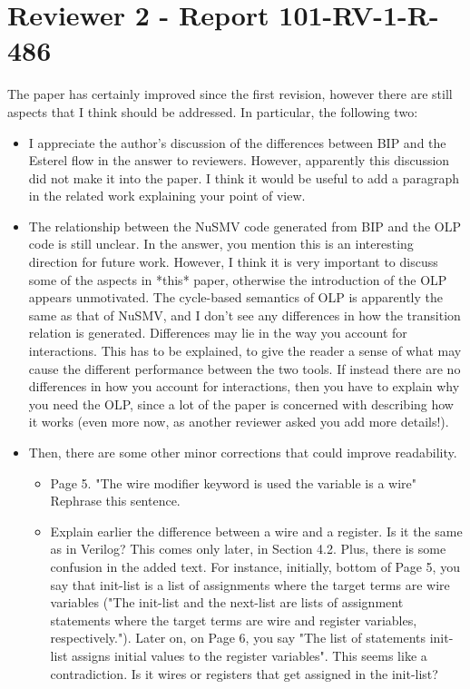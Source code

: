 \section{Reviewer 2 - Report 101-RV-1-R-486}
%
%
The paper has certainly improved since the first revision, however there are
still aspects that I think should be addressed. In particular, the following
two:

\begin{itemize}
\item I appreciate the author's discussion of the differences between BIP and the
Esterel flow in the answer to reviewers. However, apparently this discussion
did not make it into the paper. I think it would be useful to add a paragraph
in the related work explaining your point of view.

\item The relationship between the NuSMV code generated from BIP and the OLP code
is still unclear. In the answer, you mention this is an interesting direction
for future work. However, I think it is very important to discuss some of the
aspects in *this* paper, otherwise the introduction of the OLP appears
unmotivated. The cycle-based semantics of OLP is apparently the same as that
of NuSMV, and I don't see any differences in how the transition relation is
generated. Differences may lie in the way you account for interactions. This
has to be explained, to give the reader a sense of what may cause the
different performance between the two tools. If instead there are no
differences in how you account for interactions, then you have to explain why
you need the OLP, since a lot of the paper is concerned with describing how it
works (even more now, as another reviewer asked you add more details!).


\item Then, there are some other minor corrections that could improve readability.
\begin{itemize}
\item  Page 5. "The wire modifier keyword is used the variable is a wire"
Rephrase this sentence.
\item  Explain earlier the difference between a wire and a register. Is it the same
as in Verilog? This comes only later, in Section 4.2. Plus, there is some
confusion in the added text. For instance, initially, bottom of Page 5, you
say that init-list is a list of assignments where the target terms are wire
variables ("The init-list and the next-list are lists of assignment
statements where the target terms are wire and register variables,
respectively."). Later on, on Page 6, you say "The list of statements
init-list assigns initial values to the register variables". This seems like
a contradiction. Is it wires or registers that get assigned in the
init-list?


\end{itemize}
\end{itemize}
